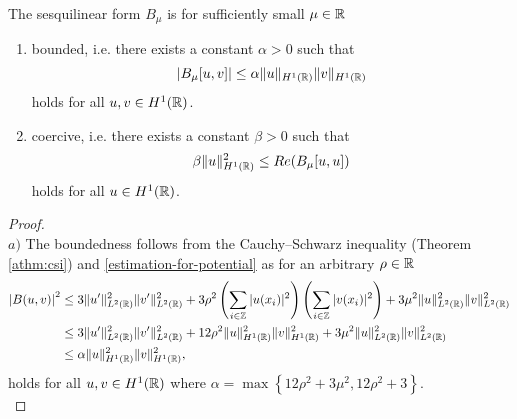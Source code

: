 \begin{theorem} \label{2.1:thm-LaxMilgram}
	The sesquilinear form $B_{\mu}$ is for sufficiently small $\mu \in \mathbb{R}$
	\begin{enumerate}[label=\alph*\upshape)]
		\item bounded, i.e. there exists a constant $\alpha > 0$ such that
			\[ \left| B_{\mu}[u,v] \right| \leq \alpha \|u\|_{H^{1}(\mathbb{R})} \|v\|_{H^{1}(\mathbb{R})} \]
			holds for all $u, v \in H^{1}(\mathbb{R})$.
		\item coercive, i.e. there exists a constant $\beta > 0$ such that
			\[ \beta \|u\|_{H^{1}(\mathbb{R})}^{2} \leq Re(B_{\mu}[u, u]) \]
			holds for all $u \in H^{1}(\mathbb{R})$.
	\end{enumerate} 
	
	\begin{proof} ~\\
		$a)$ The boundedness follows from the Cauchy–Schwarz inequality (Theorem \ref{athm:csi}) and \eqref{estimation-for-potential} as for an arbitrary $\rho \in \mathbb{R}$
		\begin{align*}
			\left| B(u, v) \right|^{2} & \leq 3 \| u' \|_{L^{2}(\mathbb{R})}^{2} \| v' \|_{L^{2}(\mathbb{R})}^{2} + 3 \rho^{2} \left( \sum_{i \in \mathbb{Z}} |u(x_{i})|^{2} \right)\left( \sum_{i \in \mathbb{Z}} |v(x_{i})|^{2} \right) + 3 \mu^{2} \| u \|_{L^{2}(\mathbb{R})}^{2} \| v \|_{L^{2}(\mathbb{R})}^{2} \\
				& \leq 3 \| u' \|_{L^{2}(\mathbb{R})}^{2} \| v' \|_{L^{2}(\mathbb{R})}^{2} + 12 \rho^{2} \| u \|^{2}_{H^{1}(\mathbb{R})} \| v \|^{2}_{H^{1}(\mathbb{R})}  + 3 \mu^{2} \| u \|_{L^{2}(\mathbb{R})}^{2} \| v \|_{L^{2}(\mathbb{R})}^{2} \\
				& \leq \alpha \| u \|^{2}_{H^{1}(\mathbb{R})} \| v \|^{2}_{H^{1}(\mathbb{R})},
		\end{align*}
		holds for all $u, v \in H^{1}(\mathbb{R})$ where $\alpha = \max \left\{ 12 \rho^{2} + 3 \mu^{2} , 12 \rho^{2} + 3 \right\}$. \\
		

\end{proof}
\end{theorem}
